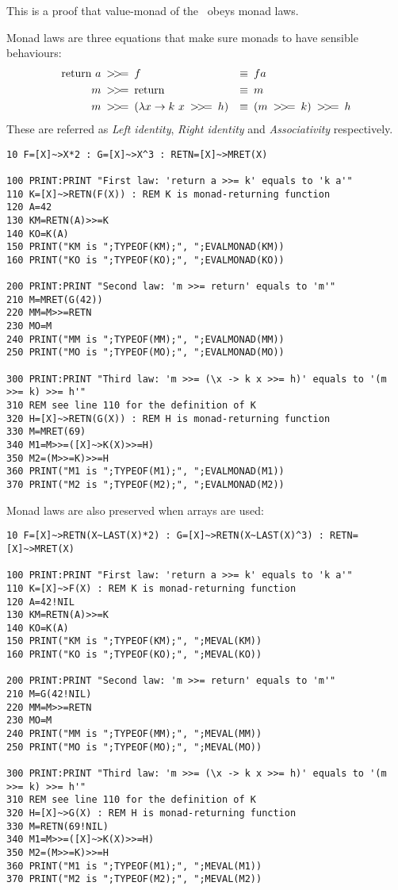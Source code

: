 This is a proof that value-monad of the \tbas\ obeys monad laws.

Monad laws are three equations that make sure monads to have sensible behaviours:
\begin{align*}
\text{return}\ a \text{\enskip\basicmbind\enskip}& f &\equiv&\enskip f a\\
m \text{\enskip\basicmbind\enskip}& \text{return} &\equiv&\enskip m\\
m \text{\enskip\basicmbind\enskip}& (\lambda x \rightarrow k\ x \text{\enskip\basicmbind\enskip} h) &\equiv&\enskip (m \text{\enskip\basicmbind\enskip} k) \text{\enskip\basicmbind\enskip} h
\end{align*}
These are referred as \emph{Left identity}, \emph{Right identity} and \emph{Associativity} respectively.

\begin{lstlisting}
10 F=[X]~>X*2 : G=[X]~>X^3 : RETN=[X]~>MRET(X)

100 PRINT:PRINT "First law: 'return a >>= k' equals to 'k a'"
110 K=[X]~>RETN(F(X)) : REM K is monad-returning function
120 A=42
130 KM=RETN(A)>>=K
140 KO=K(A)
150 PRINT("KM is ";TYPEOF(KM);", ";EVALMONAD(KM))
160 PRINT("KO is ";TYPEOF(KO);", ";EVALMONAD(KO))

200 PRINT:PRINT "Second law: 'm >>= return' equals to 'm'"
210 M=MRET(G(42))
220 MM=M>>=RETN
230 MO=M
240 PRINT("MM is ";TYPEOF(MM);", ";EVALMONAD(MM))
250 PRINT("MO is ";TYPEOF(MO);", ";EVALMONAD(MO))

300 PRINT:PRINT "Third law: 'm >>= (\x -> k x >>= h)' equals to '(m >>= k) >>= h'"
310 REM see line 110 for the definition of K
320 H=[X]~>RETN(G(X)) : REM H is monad-returning function
330 M=MRET(69)
340 M1=M>>=([X]~>K(X)>>=H)
350 M2=(M>>=K)>>=H
360 PRINT("M1 is ";TYPEOF(M1);", ";EVALMONAD(M1))
370 PRINT("M2 is ";TYPEOF(M2);", ";EVALMONAD(M2))
\end{lstlisting}

Monad laws are also preserved when arrays are used:

\begin{lstlisting}
10 F=[X]~>RETN(X~LAST(X)*2) : G=[X]~>RETN(X~LAST(X)^3) : RETN=[X]~>MRET(X)

100 PRINT:PRINT "First law: 'return a >>= k' equals to 'k a'"
110 K=[X]~>F(X) : REM K is monad-returning function
120 A=42!NIL
130 KM=RETN(A)>>=K
140 KO=K(A)
150 PRINT("KM is ";TYPEOF(KM);", ";MEVAL(KM))
160 PRINT("KO is ";TYPEOF(KO);", ";MEVAL(KO))

200 PRINT:PRINT "Second law: 'm >>= return' equals to 'm'"
210 M=G(42!NIL)
220 MM=M>>=RETN
230 MO=M
240 PRINT("MM is ";TYPEOF(MM);", ";MEVAL(MM))
250 PRINT("MO is ";TYPEOF(MO);", ";MEVAL(MO))

300 PRINT:PRINT "Third law: 'm >>= (\x -> k x >>= h)' equals to '(m >>= k) >>= h'"
310 REM see line 110 for the definition of K
320 H=[X]~>G(X) : REM H is monad-returning function
330 M=RETN(69!NIL)
340 M1=M>>=([X]~>K(X)>>=H)
350 M2=(M>>=K)>>=H
360 PRINT("M1 is ";TYPEOF(M1);", ";MEVAL(M1))
370 PRINT("M2 is ";TYPEOF(M2);", ";MEVAL(M2))
\end{lstlisting}
